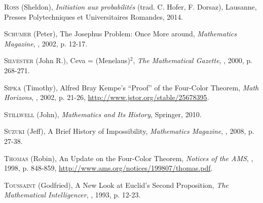 \begin{thebibliography}{99}
\textsc{Ross} (Sheldon), \emph{Initiation aux probabilités} (trad. C. Hofer, F. Dorsaz), Lausanne, Presses Polytechniques et Universitaires Romandes, 2014.



  \textsc{Schumer} (Peter), \og The {Josephus} Problem: Once More around\fg, \emph{Mathematics Magazine}, , 2002, p. 12-17.


  \textsc{Silvester} (John R.), \og Ceva = ({Menelaus})$^2$\fg, \emph{The Mathematical Gazette}, , 2000, p. 268-271.






  \textsc{Sipka} (Timothy), \og Alfred {Bray Kempe's} {``Proof''} of the Four-Color Theorem\fg, \emph{Math Horizons}, , 2002, p. 21-26, \url{http://www.jstor.org/stable/25678395}.





  \textsc{Stillwell} (John), \emph{Mathematics and Its History}, Springer, 2010.




  \textsc{Suzuki} (Jeff), \og A Brief History of Impossibility\fg, \emph{Mathematics Magazine}, , 2008, p. 27-38.

















  \textsc{Thomas} (Robin), \og An Update on the Four-Color Theorem\fg, \emph{Notices of the AMS}, , 1998, p. 848-859, \url{http://www.ams.org/notices/199807/thomas.pdf}.



  
  \textsc{Toussaint} (Godfried), \og A New Look at {Euclid's} Second Proposition\fg, \emph{The Mathematical Intelligencer}, , 1993, p. 12-23.




    
  
 















\end{thebibliography}
